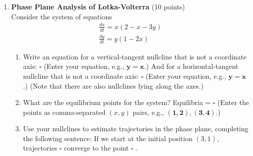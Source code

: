 \begin{enumerate}
  \item \textbf{Phase Plane Analysis of Lotka-Volterra} (10 points)\\
  Consider the system of equations
  $$
  \begin{gathered}
  \frac{d x}{d t}=x(2-x-3 y) \\
  \frac{d y}{d t}=y(1-2 x)
  \end{gathered}
  $$
  \begin{enumerate}[label=\alph*]
    \item Write an equation for a vertical-tangent nullcline that is not a coordinate axis:
    $\square$
    (Enter your equation, e.g., $\boldsymbol{y}=\boldsymbol{x}$.)
    And for a horizontal-tangent nullcline that is not a coordinate axis:
    $\square$
    (Enter your equation, e.g., $\boldsymbol{y}=\boldsymbol{x}$.)
    (Note that there are also nullclines lying along the axes.)
    \begin{subanswer}
    \end{subanswer}
    \item What are the equilibrium points for the system?
    Equilibria = $\square$
    (Enter the points as comma-separated $(x, y)$ pairs, e.g., $(\mathbf{1 , 2}),(\mathbf{3 , 4})$.)
    \begin{subanswer}
    \end{subanswer}
    \item Use your nullclines to estimate trajectories in the phase plane, completing the following sentence:
    If we start at the initial position $(3,1)$, trajectories $\square$ converge to the point $\square$ .
    \begin{subanswer}
    \end{subanswer}
  \end{enumerate}


\end{enumerate}
